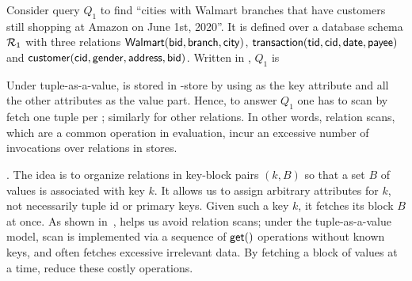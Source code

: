 \begin{example}\label{exa-taav}
Consider query $Q_{1}$ to find ``cities with Walmart branches that
have customers still shopping at %
Amazon on
June 1st, 2020''. It is
defined over
a database schema ${\mathcal R}_{1}$ with three relations
$\protect\mathsf{Walmart}(\protect\mathsf{bid},\allowbreak \protect\mathsf{branch},\allowbreak \protect\mathsf{city})$,
$\protect\mathsf{transaction}(\protect\mathsf{tid},\allowbreak \protect\mathsf{cid},\allowbreak \protect\mathsf{date},\allowbreak
\protect\mathsf{payee})$ and $\protect\mathsf{customer}(\protect\mathsf{cid},\allowbreak \protect\mathsf{gender},\allowbreak
\protect\mathsf{address},\allowbreak \protect\mathsf{bid})$. Written in \SQL, $Q_{1}$ is

\vspace{-0.1ex}
{\small
  }
\vspace{-0.3ex}

Under tuple-as-a-value,  is stored in \kv-store
by using  as the key attribute and all the other
attributes as the value part. Hence, to answer $Q_{1}$ one
has to scan  by fetch one tuple per \get;
similarly  for other relations. In other words, relation scans,
which are a common operation in \SQL evaluation, incur an excessive
number of \get invocations over relations in \kv stores.
\end{example}

. The idea is to organize
relations in key-block pairs $(k, B)$ so that a set $B$ of values
is associated with key $k$. It allows us to assign arbitrary
attributes for $k$, not necessarily tuple id or primary keys.
Given such a key $k$, it fetches its block $B$ at once.
As shown in~\cite{VLDB19}, \baav helps us avoid relation scans;
under the tuple-as-a-value model, scan is implemented via
a sequence %
of $\protect\mathsf{get}()$ operations without known keys,
and often fetches excessive irrelevant data. By fetching a block
of values at a time, \baav reduce these costly operations.




